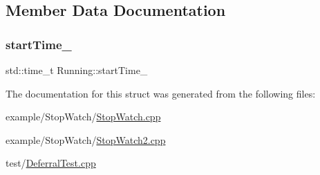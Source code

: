 \subsection{Member Data Documentation}
\mbox{\label{struct_running_ae8dcc437642cde76fb5f317657e59222}} 
\subsubsection{\texorpdfstring{start\+Time\+\_\+}{startTime\_}}
{\footnotesize\ttfamily std\+::time\+\_\+t Running\+::start\+Time\+\_\+\hspace{0.3cm}{\ttfamily [private]}}



The documentation for this struct was generated from the following files\+:\begin{DoxyCompactItemize}
\item 
example/\+Stop\+Watch/\mbox{\hyperlink{_stop_watch_8cpp}{Stop\+Watch.\+cpp}}\item 
example/\+Stop\+Watch/\mbox{\hyperlink{_stop_watch2_8cpp}{Stop\+Watch2.\+cpp}}\item 
test/\mbox{\hyperlink{_deferral_test_8cpp}{Deferral\+Test.\+cpp}}\end{DoxyCompactItemize}
